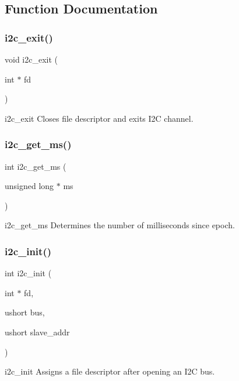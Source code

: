 \subsection{Function Documentation}
\mbox{\label{i2c_8h_a6a4eb4288befb89cdb4c91388b991da3}} 
\subsubsection{i2c\+\_\+exit()}
{\footnotesize\ttfamily void i2c\+\_\+exit (\begin{DoxyParamCaption}\item[{int $\ast$}]{fd }\end{DoxyParamCaption})}

i2c\+\_\+exit Closes file descriptor and exits I2C channel. \mbox{\label{i2c_8h_ac453d14ecb36d0b4120fe2300ebe1e88}} 
\subsubsection{i2c\+\_\+get\+\_\+ms()}
{\footnotesize\ttfamily int i2c\+\_\+get\+\_\+ms (\begin{DoxyParamCaption}\item[{unsigned long $\ast$}]{ms }\end{DoxyParamCaption})}

i2c\+\_\+get\+\_\+ms Determines the number of milliseconds since epoch. \mbox{\label{i2c_8h_aca5c7fc94e3f29302d2c3cf690c1abfb}} 
\subsubsection{i2c\+\_\+init()}
{\footnotesize\ttfamily int i2c\+\_\+init (\begin{DoxyParamCaption}\item[{int $\ast$}]{fd,  }\item[{ushort}]{bus,  }\item[{ushort}]{slave\+\_\+addr }\end{DoxyParamCaption})}

i2c\+\_\+init Assigns a file descriptor after opening an I2C bus. \mbox{\label{i2c_8h_a466df9db074b3d42cb3f5420cedc113a}} 
